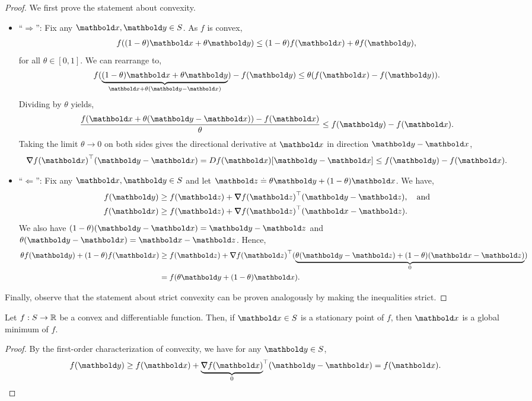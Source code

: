 \begin{proof} We first prove the statement about convexity. \begin{itemize}
    \item ``$\Rightarrow$'': Fix any $\vx, \vy \in \sS$. As $f$ is convex, \begin{align*}
        f((1-\theta)\vx + \theta\vy) \leq (1-\theta)f(\vx) + \theta f(\vy),
    \end{align*} for all $\theta \in [0,1]$. We can rearrange to, \begin{align*}
        f(\underbrace{(1-\theta)\vx + \theta\vy}_{\vx + \theta(\vy - \vx)}) - f(\vy) \leq \theta(f(\vx) - f(\vy)).
    \end{align*} Dividing by $\theta$ yields, \begin{align*}
        \frac{f(\vx + \theta(\vy - \vx)) - f(\vx)}{\theta} \leq f(\vy) - f(\vx).
    \end{align*} Taking the limit $\theta \to 0$ on both sides gives the directional derivative at $\vx$ in direction $\vy - \vx$, \begin{align*}
        \trans{\grad f(\vx)}(\vy - \vx) = D f(\vx)[\vy - \vx] \leq f(\vy) - f(\vx).
    \end{align*}
    
    \item ``$\Leftarrow$'': Fix any $\vx, \vy \in \sS$ and let $\vz \defeq \theta\vy + (1-\theta)\vx$. We have, \begin{align*}
        f(\vy) &\geq f(\vz) + \trans{\grad f(\vz)}(\vy - \vz), \quad\text{and} \\
        f(\vx) &\geq f(\vz) + \trans{\grad f(\vz)}(\vx - \vz).
    \end{align*} We also have $(1-\theta)(\vy-\vx) = \vy - \vz$ and $\theta(\vy - \vx) = \vx - \vz$. Hence, \begin{align*}
        \theta f(\vy) + (1-\theta) f(\vx) &\geq f(\vz) + \trans{\grad f(\vz)}(\underbrace{\theta(\vy - \vz) + (1-\theta)(\vx - \vz)}_{0}) \\
        &= f(\theta\vy + (1-\theta)\vx).
    \end{align*}
\end{itemize}

Finally, observe that the statement about strict convexity can be proven analogously by making the inequalities strict.
\end{proof}

\begin{thm} Let $f: S \to \mathbb{R}$ be a convex and differentiable function. Then, if $\vx \in \sS$ is a stationary point of $f$, then $\vx$ is a global minimum of $f$.
\end{thm}
\begin{proof} By the first-order characterization of convexity, we have for any $\vy \in \sS$, \begin{align*}
    f(\vy) \geq f(\vx) + \trans{\underbrace{\grad f(\vx)}_{0}}(\vy - \vx) = f(\vx). &\qedhere
\end{align*}
\end{proof}

